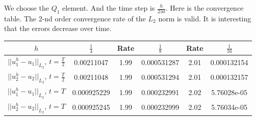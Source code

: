 \documentclass[lang=en,11pt,a4paper]{elegantpaper}
\begin{document}
We choose the $Q_1$ element. And the time step is $\frac{h}{250}$. 
Here is the convergence table. 
The $2$-nd order convergence rate of the $L_2$ norm is valid.
It is interesting that the errors decrease over time.

\begin{table}[H]
    \centering
    \begin{tabular}{cccccc}
    \hline
    $h$                                    & $\frac{1}{4}$ & Rate & $\frac{1}{8}$ & Rate & $\frac{1}{16}$ \\ \hline
    $||u^h_1-u_1||_{L_2}$, $t=\frac{T}{2}$ & 0.00211047    & 1.99 & 0.000531287   & 2.01 & 0.000132154    \\
    $||u^h_2-u_2||_{L_2}$, $t=\frac{T}{2}$ & 0.00211048    & 1.99 & 0.000531294   & 2.01 & 0.000132157    \\ \hline
    $||u^h_1-u_1||_{L_2}$, $t=T$           & 0.000925229   & 1.99 & 0.000232991   & 2.02 & 5.76028e-05    \\
    $||u^h_2-u_2||_{L_2}$, $t=T$           & 0.000925245   & 1.99 & 0.000232999   & 2.02 & 5.76034e-05    \\ \hline
    \end{tabular}
\end{table}

\appendix
\addappheadtotoc
\end{document}

